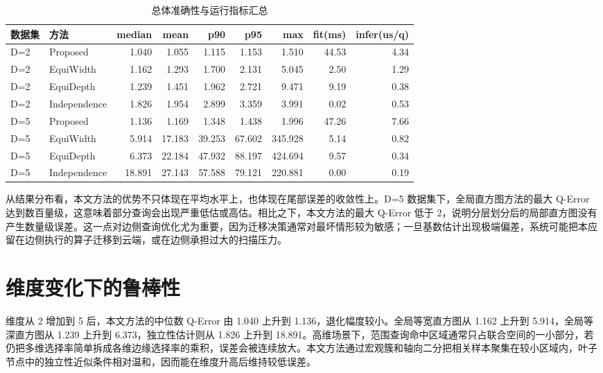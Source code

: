 \begin{table}[htbp]
  \centering
  \caption{总体准确性与运行指标汇总}
  \label{tab:main-accuracy}
  \begin{tabular}{llrrrrrrr}
    \hline
    数据集 & 方法 & median & mean & p90 & p95 & max & fit(ms) & infer(us/q) \\
    \hline
    D=2 & Proposed & 1.040 & 1.055 & 1.115 & 1.153 & 1.510 & 44.53 & 4.34 \\
    D=2 & EquiWidth & 1.162 & 1.293 & 1.700 & 2.131 & 5.045 & 2.50 & 1.29 \\
    D=2 & EquiDepth & 1.239 & 1.451 & 1.962 & 2.721 & 9.471 & 9.19 & 0.38 \\
    D=2 & Independence & 1.826 & 1.954 & 2.899 & 3.359 & 3.991 & 0.02 & 0.53 \\
    D=5 & Proposed & 1.136 & 1.169 & 1.348 & 1.438 & 1.996 & 47.26 & 7.66 \\
    D=5 & EquiWidth & 5.914 & 17.183 & 39.253 & 67.602 & 345.928 & 5.14 & 0.82 \\
    D=5 & EquiDepth & 6.373 & 22.184 & 47.932 & 88.197 & 424.694 & 9.57 & 0.34 \\
    D=5 & Independence & 18.891 & 27.143 & 57.588 & 79.121 & 220.881 & 0.00 & 0.19 \\
    \hline
  \end{tabular}
\end{table}

从结果分布看，本文方法的优势不只体现在平均水平上，也体现在尾部误差的收敛性上。D=5 数据集下，全局直方图方法的最大 Q-Error 达到数百量级，这意味着部分查询会出现严重低估或高估。相比之下，本文方法的最大 Q-Error 低于 2，说明分层划分后的局部直方图没有产生数量级误差。这一点对边侧查询优化尤为重要，因为迁移决策通常对最坏情形较为敏感；一旦基数估计出现极端偏差，系统可能把本应留在边侧执行的算子迁移到云端，或在边侧承担过大的扫描压力。

\section{维度变化下的鲁棒性}

维度从 2 增加到 5 后，本文方法的中位数 Q-Error 由 1.040 上升到 1.136，退化幅度较小。全局等宽直方图从 1.162 上升到 5.914，全局等深直方图从 1.239 上升到 6.373，独立性估计则从 1.826 上升到 18.891。高维场景下，范围查询命中区域通常只占联合空间的一小部分，若仍把多维选择率简单拆成各维边缘选择率的乘积，误差会被连续放大。本文方法通过宏观簇和轴向二分把相关样本聚集在较小区域内，叶子节点中的独立性近似条件相对温和，因而能在维度升高后维持较低误差。

